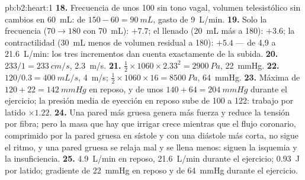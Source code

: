 \begin{solution}{pb:b2:heart:1}
\textbf{18.} Frecuencia de unos 100 sin tono vagal, volumen telesistólico
sin cambios en \qty{60}{mL}:  de $150 - 60 = \qty{90}{mL}$,
gasto de \qty{9}{L/min}.
\textbf{19.} Solo la frecuencia ($70 \to 180$ con \qty{70}{mL}): $+7.7$;
el llenado (\qty{20}{mL} más a 180): $+3.6$; la contractilidad
(\qty{30}{mL} menos de volumen residual a 180): $+5.4$ --- de 4,9 a
\qty{21.6}{L/min}: los tres incrementos dan cuenta exactamente de la
subida.
\textbf{20.} $233/1 = \qty{233}{cm/s}$, \qty{2.3}{m/s}.
\textbf{21.} $\tfrac12\times 1060\times 2.33^{2} = \qty{2900}{Pa}$,
\qty{22}{mmHg}.
\textbf{22.} $120/0.3 = \qty{400}{mL/s}$, \qty{4}{m/s}; $\tfrac12\times
1060\times 16 = \qty{8500}{Pa}$, \qty{64}{mmHg}.
\textbf{23.} Máxima de $120 + 22 = \qty{142}{mmHg}$ en reposo, y de unos
$140 +
64 = \qty{204}{mmHg}$ durante el ejercicio; la presión media de eyección en
reposo sube de 100 a 122: trabajo por latido $\times 1.22$.
\textbf{24.} Una pared más gruesa genera más fuerza y reduce la tensión
por fibra; pero la masa que hay que irrigar crece mientras que el flujo
coronario, comprimido por la pared gruesa en sístole y con una diástole
más corta, no sigue el ritmo, y una pared gruesa se relaja mal y se llena
menos: siguen la isquemia y la insuficiencia.
\textbf{25.} \qty{4.9}{L/min} en reposo, \qty{21.6}{L/min} durante el
ejercicio; \qty{0.93}{J} por latido; gradiente de \qty{22}{mmHg} en reposo
y de \qty{64}{mmHg} durante el ejercicio.
\end{solution}
